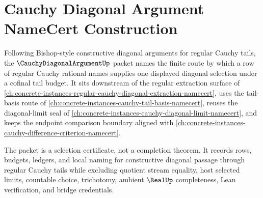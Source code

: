 \chapter{Cauchy Diagonal Argument NameCert Construction}
\label{ch:concrete-instances-cauchy-diagonal-argument-namecert}

Following Bishop-style constructive diagonal arguments for regular Cauchy tails, the $\CauchyDiagonalArgumentUp$ packet names the finite route by which a row of regular Cauchy rational names supplies one displayed diagonal selection under a cofinal tail budget. It sits downstream of the regular extraction surface of \autoref{ch:concrete-instances-regular-cauchy-diagonal-extraction-namecert}, uses the tail-basis route of \autoref{ch:concrete-instances-cauchy-tail-basis-namecert}, reuses the diagonal-limit seal of \autoref{ch:concrete-instances-cauchy-diagonal-limit-namecert}, and keeps the endpoint comparison boundary aligned with \autoref{ch:concrete-instances-cauchy-difference-criterion-namecert}.

The packet is a selection certificate, not a completion theorem. It records rows, budgets, ledgers, and local naming for constructive diagonal passage through regular Cauchy tails while excluding quotient stream equality, host selected limits, countable choice, trichotomy, ambient $\RealUp$ completeness, Lean verification, and bridge credentials.

